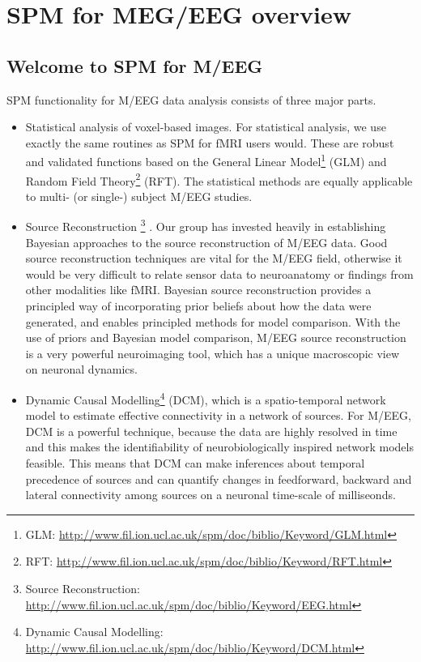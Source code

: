 \chapter{SPM for MEG/EEG overview \label{Chap:eeg:overview}}

\section{Welcome to SPM for M/EEG}

SPM functionality for M/EEG data analysis consists of three major parts. 

\begin{itemize}
 \item Statistical analysis of voxel-based images. For statistical analysis, we use exactly the same routines as SPM for fMRI users would. These are robust and validated functions based on the General Linear Model\footnote{GLM: \url{http://www.fil.ion.ucl.ac.uk/spm/doc/biblio/Keyword/GLM.html}} (GLM) and Random Field Theory\footnote{RFT: \url{http://www.fil.ion.ucl.ac.uk/spm/doc/biblio/Keyword/RFT.html}} (RFT). The statistical methods are equally applicable to multi- (or single-) subject M/EEG studies.

\item  Source Reconstruction \footnote{Source Reconstruction: \url{http://www.fil.ion.ucl.ac.uk/spm/doc/biblio/Keyword/EEG.html}} . Our group has invested heavily in establishing Bayesian approaches to the source reconstruction of M/EEG data. Good source reconstruction techniques are vital for the M/EEG field, otherwise it would be very difficult to relate sensor data to neuroanatomy or findings from other modalities like fMRI. Bayesian source reconstruction provides a principled way of incorporating prior beliefs about how the data were generated, and enables principled methods for model comparison. With the use of priors and Bayesian model comparison, M/EEG source reconstruction is a very powerful neuroimaging tool, which has a unique macroscopic view on neuronal dynamics.

\item Dynamic Causal Modelling\footnote{Dynamic Causal Modelling: \url{http://www.fil.ion.ucl.ac.uk/spm/doc/biblio/Keyword/DCM.html}} (DCM), which is a spatio-temporal network model to estimate effective connectivity in a network of sources. For M/EEG, DCM is a powerful technique, because the data are highly resolved in time and this makes the identifiability of neurobiologically inspired network models feasible. This means that DCM can make inferences about temporal precedence of sources and can quantify changes in feedforward, backward and lateral connectivity among sources on a neuronal time-scale of milliseonds. 
\end{itemize}

